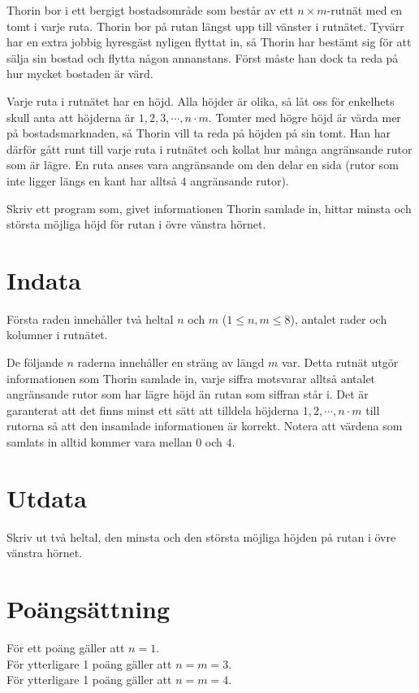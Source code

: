 

\noindent
Thorin bor i ett bergigt bostadsområde som består av ett $n \times m$-rutnät med en tomt i varje ruta.
Thorin bor på rutan längst upp till vänster i rutnätet.
Tyvärr har en extra jobbig hyresgäst nyligen flyttat in, så Thorin har bestämt sig för att sälja sin bostad och flytta någon annanstans.
Först måste han dock ta reda på hur mycket bostaden är värd.

Varje ruta i rutnätet har en höjd. Alla höjder är olika, så låt oss för enkelhets skull anta att höjderna är $1, 2, 3, \cdots, n\cdot m$.
Tomter med högre höjd är värda mer på bostadsmarknaden, så Thorin vill ta reda på höjden på sin tomt. Han har därför gått runt till varje ruta i rutnätet och kollat hur många angränsande rutor som är lägre.
En ruta anses vara angränsande om den delar en sida (rutor som inte ligger längs en kant har alltså $4$ angränsande rutor).

Skriv ett program som, givet informationen Thorin samlade in, hittar minsta och största möjliga höjd för rutan i övre vänstra hörnet.

\section*{Indata}
Första raden innehåller två heltal $n$ och $m$ ($1 \leq n,m \leq 8$), antalet rader och kolumner i
rutnätet.

De följande $n$ raderna innehåller en sträng av längd $m$ var. Detta rutnät utgör informationen
som Thorin samlade in, varje siffra motsvarar alltså antalet angränsande rutor som har lägre höjd än rutan som
siffran står i. Det är garanterat att det finns minst ett sätt att tilldela höjderna 
$1, 2, \cdots, n\cdot m$ till rutorna så att den insamlade informationen är korrekt. Notera att värdena
som samlats in alltid kommer vara mellan $0$ och $4$.

\section*{Utdata}
Skriv ut två heltal, den minsta och den största möjliga höjden på rutan i övre vänstra hörnet.

\section*{Poängsättning}
För ett poäng gäller att $n = 1$.\\
För ytterligare 1 poäng gäller att $n = m = 3$.\\
För ytterligare 1 poäng gäller att $n = m = 4$.\\
